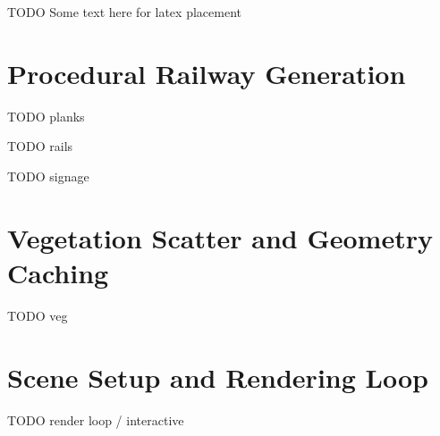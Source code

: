 TODO Some text here for latex placement


\section{Procedural Railway Generation}
\label{sec:procedural-railway-generation}

TODO planks

TODO rails

TODO signage



\section{Vegetation Scatter and Geometry Caching}
\label{sec:vegetation-scatter}


TODO veg


\section{Scene Setup and Rendering Loop}
\label{sec:rendering}


TODO render loop / interactive
